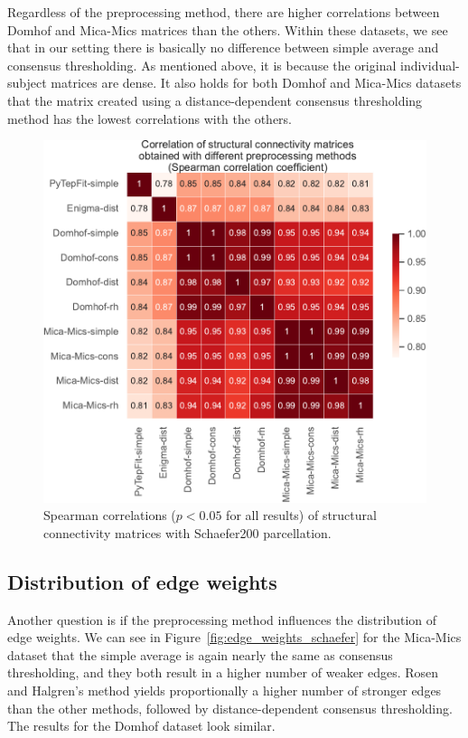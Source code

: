 Regardless of the preprocessing method, there are higher correlations between Domhof and Mica-Mics matrices than the others. Within these datasets, we see that in our setting there is basically no difference between simple average and consensus thresholding. As mentioned above, it is because the original individual-subject matrices are dense. It also holds for both Domhof and Mica-Mics datasets that the matrix created using a distance-dependent consensus thresholding method has the lowest correlations with the others.

\begin{figure}[p]
  \begin{center}
    \includegraphics[width=\textwidth]{images/nootebook_generated/comparing_sc_matrices/schaefer/correlations_all_matrices_Spearman.pdf}
  \end{center}
  \caption[Correlations of SC matrices (Schaefer200 parcellation)]{Spearman correlations ($p<0.05$ for all results) of structural connectivity matrices with Schaefer200 parcellation. }
  \label{fig:sc_correlations}
\end{figure}

\subsection{Distribution of edge weights}

Another question is if the preprocessing method influences the distribution of edge weights. We can see in Figure~\ref{fig:edge_weights_schaefer} for the Mica-Mics dataset that the simple average is again nearly the same as consensus thresholding, and they both result in a higher number of weaker edges. Rosen and Halgren's method yields proportionally a higher number of stronger edges than the other methods, followed by distance-dependent consensus thresholding. The results for the Domhof dataset look similar.

